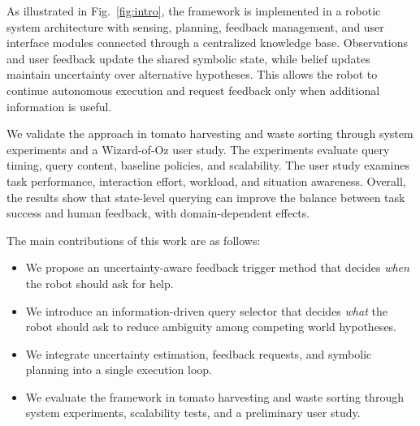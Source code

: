 As illustrated in Fig.~\ref{fig:intro}, the framework is implemented in a robotic system architecture with sensing, planning, feedback management, and user interface modules connected through a centralized knowledge base. Observations and user feedback update the shared symbolic state, while belief updates maintain uncertainty over alternative hypotheses. This allows the robot to continue autonomous execution and request feedback only when additional information is useful.


We validate the approach in tomato harvesting and waste sorting through system experiments and a Wizard-of-Oz user study. The experiments evaluate query timing, query content, baseline policies, and scalability. The user study examines task performance, interaction effort, workload, and situation awareness. Overall, the results show that state-level querying can improve the balance between task success and human feedback, with domain-dependent effects.

The main contributions of this work are as follows:

\begin{itemize}

\item We propose an uncertainty-aware feedback trigger method that decides \textit{when} the robot should ask for help.

\item We introduce an information-driven query selector that decides \textit{what} the robot should ask to reduce ambiguity among competing world hypotheses.

\item We integrate uncertainty estimation, feedback requests, and symbolic planning into a single execution loop.

\item We evaluate the framework in tomato harvesting and waste sorting through system experiments, scalability tests, and a preliminary user study.

\end{itemize}

